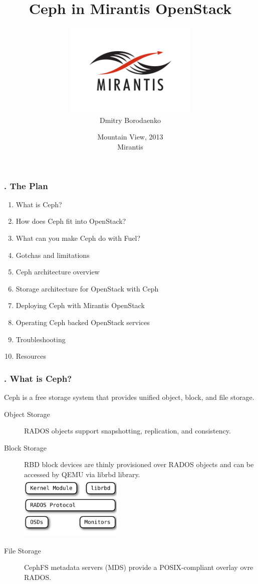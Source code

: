 \documentclass[hyperref=unicode,utf8,xcolor=pst]{beamer}
\title{Ceph in Mirantis OpenStack}
\author{\includegraphics[height=4.5cm]{Vector_RGB_MirantisLogo}\\Dmitry Borodaenko}
\date{Mountain View, 2013\\ Mirantis}
\begin{document}
\begin{frame}
	\titlepage
\end{frame}

\begin{frame}
	\setcounter{framenumber}{1}
	\frametitle{\insertframenumber{}. The Plan}
	\begin{enumerate}
		\item What is Ceph?
		\item How does Ceph fit into OpenStack?
		\item What can you make Ceph do with Fuel?
		\item Gotchas and limitations
		\item Ceph architecture overview
		\item Storage architecture for OpenStack with Ceph
		\item Deploying Ceph with Mirantis OpenStack
		\item Operating Ceph backed OpenStack services
		\item Troubleshooting
		\item Resources
	\end{enumerate}
\end{frame}

\begin{frame}
	\frametitle{\insertframenumber{}. What is Ceph?}
	Ceph is a free storage system that provides unified object,
	block, and file storage.

	\begin{description}
		\item[Object Storage] RADOS objects support
			snapshotting, replication, and consistency.
		\item[Block Storage] RBD block devices are thinly
			provisioned over RADOS objects and can be
			accessed by QEMU via librbd library.\\
			\includegraphics[height=3cm]{ceph-rbd}
		\item[File Storage] CephFS metadata servers (MDS)
			provide a POSIX-compliant overlay ovre RADOS.
	\end{description}
\end{frame}
\end{document}
